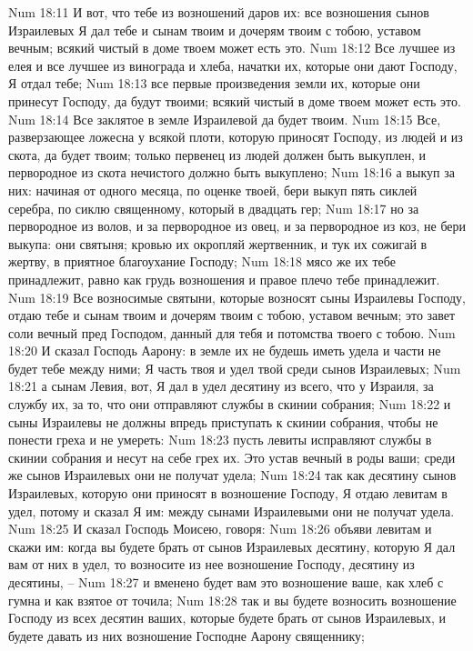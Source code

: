 Num 18:11  И вот, что тебе из возношений даров их: все возношения сынов Израилевых Я дал тебе и сынам твоим и дочерям твоим с тобою, уставом вечным; всякий чистый в доме твоем может есть это.
Num 18:12  Все лучшее из елея и все лучшее из винограда и хлеба, начатки их, которые они дают Господу, Я отдал тебе;
Num 18:13  все первые произведения земли их, которые они принесут Господу, да будут твоими; всякий чистый в доме твоем может есть это.
Num 18:14  Все заклятое в земле Израилевой да будет твоим.
Num 18:15  Все, разверзающее ложесна у всякой плоти, которую приносят Господу, из людей и из скота, да будет твоим; только первенец из людей должен быть выкуплен, и первородное из скота нечистого должно быть выкуплено;
Num 18:16  а выкуп за них: начиная от одного месяца, по оценке твоей, бери выкуп пять сиклей серебра, по сиклю священному, который в двадцать гер;
Num 18:17  но за первородное из волов, и за первородное из овец, и за первородное из коз, не бери выкупа: они святыня; кровью их окропляй жертвенник, и тук их сожигай в жертву, в приятное благоухание Господу;
Num 18:18  мясо же их тебе принадлежит, равно как грудь возношения и правое плечо тебе принадлежит.
Num 18:19  Все возносимые святыни, которые возносят сыны Израилевы Господу, отдаю тебе и сынам твоим и дочерям твоим с тобою, уставом вечным; это завет соли вечный пред Господом, данный для тебя и потомства твоего с тобою.
Num 18:20  И сказал Господь Аарону: в земле их не будешь иметь удела и части не будет тебе между ними; Я часть твоя и удел твой среди сынов Израилевых;
Num 18:21  а сынам Левия, вот, Я дал в удел десятину из всего, что у Израиля, за службу их, за то, что они отправляют службы в скинии собрания;
Num 18:22  и сыны Израилевы не должны впредь приступать к скинии собрания, чтобы не понести греха и не умереть:
Num 18:23  пусть левиты исправляют службы в скинии собрания и несут на себе грех их. Это устав вечный в роды ваши; среди же сынов Израилевых они не получат удела;
Num 18:24  так как десятину сынов Израилевых, которую они приносят в возношение Господу, Я отдаю левитам в удел, потому и сказал Я им: между сынами Израилевыми они не получат удела.
Num 18:25  И сказал Господь Моисею, говоря:
Num 18:26  объяви левитам и скажи им: когда вы будете брать от сынов Израилевых десятину, которую Я дал вам от них в удел, то возносите из нее возношение Господу, десятину из десятины, --
Num 18:27  и вменено будет вам это возношение ваше, как хлеб с гумна и как взятое от точила;
Num 18:28  так и вы будете возносить возношение Господу из всех десятин ваших, которые будете брать от сынов Израилевых, и будете давать из них возношение Господне Аарону священнику;

